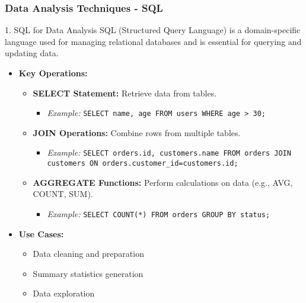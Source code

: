 \documentclass{beamer}
\begin{document}
\begin{frame}[fragile]
    \frametitle{Data Analysis Techniques - SQL}
    \begin{block}{1. SQL for Data Analysis}
        SQL (Structured Query Language) is a domain-specific language used 
        for managing relational databases and is essential for querying 
        and updating data.
    \end{block}
    
    \begin{itemize}
        \item \textbf{Key Operations:}
            \begin{itemize}
                \item \textbf{SELECT Statement:} Retrieve data from tables.
                    \begin{itemize}
                        \item \textit{Example:} \texttt{SELECT name, age FROM users WHERE age > 30;}
                    \end{itemize}
                \item \textbf{JOIN Operations:} Combine rows from multiple tables.
                    \begin{itemize}
                        \item \textit{Example:} \texttt{SELECT orders.id, customers.name FROM orders JOIN customers ON orders.customer\_id=customers.id;}
                    \end{itemize}
                \item \textbf{AGGREGATE Functions:} Perform calculations on data (e.g., AVG, COUNT, SUM).
                    \begin{itemize}
                        \item \textit{Example:} \texttt{SELECT COUNT(*) FROM orders GROUP BY status;}
                    \end{itemize}
            \end{itemize}
        
        \item \textbf{Use Cases:}
            \begin{itemize}
                \item Data cleaning and preparation
                \item Summary statistics generation
                \item Data exploration
            \end{itemize}
    \end{itemize}
\end{frame}
\end{document}
